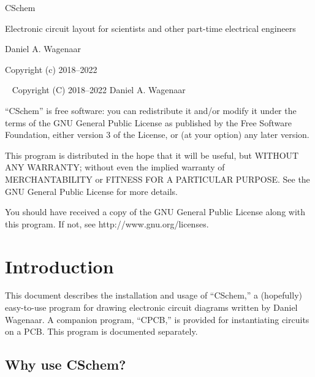 \documentclass[11pt]{report}
\begin{document}
\thispagestyle{empty}
\begin{centering}
  {\Huge CSchem}
  \vskip30pt

  {\large Electronic circuit layout for scientists and other part-time
    electrical engineers} \vskip60pt

  {\large Daniel A. Wagenaar}
  \vfill
  
  {Copyright (c) 2018--2022}
  
\end{centering}
\pagebreak
~
\vfill
\noindent Copyright (C) 2018--2022 Daniel A. Wagenaar\medskip

``CSchem'' is free software: you can redistribute it and/or modify
it under the terms of the GNU General Public License as published by
the Free Software Foundation, either version 3 of the License, or
(at your option) any later version.

This program is distributed in the hope that it will be useful,
but WITHOUT ANY WARRANTY; without even the implied warranty of
MERCHANTABILITY or FITNESS FOR A PARTICULAR PURPOSE.  See the
GNU General Public License for more details.

You should have received a copy of the GNU General Public License
along with this program.  If not, see http://www.gnu.org/licenses.
\pagebreak

\chapter{Introduction}

This document describes the installation and usage of ``CSchem,'' a
(hopefully) easy-to-use program for drawing electronic circuit
diagrams written by Daniel Wagenaar. A companion program, ``CPCB,''
is provided for instantiating circuits on a PCB. This program is
documented separately.

\section{Why use CSchem?}
\end{document}
